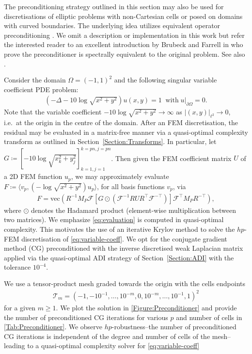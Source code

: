 \documentclass[hidelinks,onefignum,onetabnum]{siamart220329}
\def\secref#1{Section~\ref{Section:#1}}
\begin{document}
\begin{remark}
The preconditioning strategy outlined in this section may also be used for discretisations of elliptic problems with non-Cartesian cells or posed on domains with curved boundaries. The underlying idea utilizes equivalent operator preconditioning \cite{axelsson2009}. We omit a description or implementation in this work but refer the interested reader to an excellent introduction by Brubeck and Farrell in \cite[Sec.~2.7]{Brubeck2022} who prove the preconditioner is spectrally equivalent to the original problem. See also \cite{couzy1995,fischer2000,witte2021}.
\end{remark}

Consider the domain $\Omega = (-1,1)^2$ and the following singular variable coefficient PDE problem:
\begin{align}
(-\Delta  - 10 \log \sqrt{x^2+y^2}) u(x,y) = 1 \;\; \text{with} \; u|_{\partial \Omega} = 0.
\label{eq:variable-coeff}
\end{align}
Note that the variable coefficient $- 10 \log \sqrt{x^2+y^2} \to \infty$ as $|(x,y)|_{\ell^2} \to 0$, i.e.~at the origin in the centre of the domain. After an FEM discretisation, the residual may be evaluated in a matrix-free manner via a quasi-optimal complexity transform as outlined in \secref{Transforms}. In particular, let $G \coloneqq [- 10 \log \sqrt{x_k^2+y_j^2}]_{k=1,j=1}^{k=pn,j=pn}$. Then given the FEM coefficient matrix $U$ of a 2D FEM function $u_{p}$, we may approximately evaluate $F \coloneqq \langle v_p, (- \log \sqrt{x^2+y^2}) u_{p} \rangle$, for all basis functions $v_{p}$, via
\begin{align}
F = \mathrm{vec}(R^{-1} M_P \mathcal{F}[ G \odot (\mathcal{F}^{-1} R U R^\top \mathcal{F}^{-\top})] \mathcal{F}^\top M_P R^{-\top}),
\label{eq:evaluation}
\end{align}
where $\odot$ denotes the Hadamard product (element-wise multiplication between two matrices). We emphasize \cref{eq:evaluation} is computed in quasi-optimal complexity. This motivates the use of an iterative Krylov method to solve the $hp$-FEM discretisation of \cref{eq:variable-coeff}. We opt for the conjugate gradient method (CG) preconditioned with the inverse discretised weak Laplacian matrix applied via the quasi-optimal ADI strategy of \secref{ADI} with the tolerance $10^{-4}$.

We use a tensor-product mesh graded towards the origin with the cells endpoints
\begin{align}
\mathcal{T}_m = (-1, -10^{-1}, \dots, 10^{-m}, 0, 10^{-m}, \dots, 10^{-1}, 1)^2
\label{eq:graded-mesh}
\end{align}
for a given $m \geq 1$. We plot the solution in \cref{Figure:Preconditioner} and provide the number of preconditioned CG iterations for various $p$ and number of cells in \cref{Tab:Preconditioner}. We observe $hp$-robustness--the number of preconditioned CG iterations is independent of the degree and number of cells of the mesh--leading to a quasi-optimal complexity solver for \cref{eq:variable-coeff}
\end{document}
